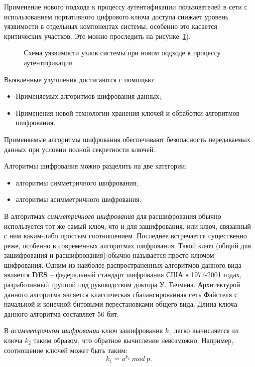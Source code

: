 Применение нового подхода к процессу аутентификации пользователей в сети с
использованием портативного цифрового ключа доступа снижает уровень уязвимости в
отдельных компонентах системы, особенно это касается критических участков. Это
можно проследить на рисунке~\ref{ris:2.2}).

 \begin{figure}[h]
\center{\texttt{[image: 2-2]}}
\caption{Схема уязвимости узлов системы при новом подходе к процессу аутентификации}
\label{ris:2.2} 
\end{figure}


Выявленные улучшения достигаются с помощью:
\begin{itemize}
  \item Применяемых алгоритмов шифрования данных;
  \item Применения новой технологии хранения ключей и обработки алгоритмов
шифрования.
\end{itemize}

Применяемые алгоритмы шифрования обеспечивают безопасность передаваемых данных
при условии полной секретности ключей. 
  
Алгоритмы шифрования можно разделить на две категории:
\begin{itemize}
  \item алгоритмы симметричного шифрования;
  \item алгоритмы асимметричного шифрования.
\end{itemize}
	
В алгоритмах \textit{симметричного шифрования} для расшифрования обычно
используется тот же самый ключ, что и для зашифрования, или ключ, связанный с ним каким-либо
простым соотношением. Последнее встречается существенно реже, особенно в
современных алгоритмах шифрования. Такой ключ (общий для зашифрования и
расшифрования) обычно называется просто ключом шифрования.
Одним из наиболее распространенных алгоритмов данного вида является 
\textbf{DES} -- федеральный стандарт шифрования США в 1977-2001 годах,
разработанный группой под руководством доктора У. Тачмена. Архитектурой данного
алгоритма является классическая сбалансированная сеть Файстеля с начальной и
конечной битовыми перестановками общего вида. Длина ключа данного алгоритма
составляет 56 бит.

В \textit{асимметричном шифровании} ключ зашифрования $k_{1}$ легко вычисляется
из ключа $k_{2}$ таким образом, что обратное вычисление невозможно. Например, соотношение
ключей может быть таким:
\begin{equation}
k_{1} = a^{k_{2}} \ mod \ p ,
\end{equation}

